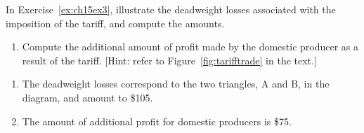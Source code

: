 \begin{enumialphparenastyle}
\begin{ex}\label{ex:ch15ex4}
In Exercise~\ref{ex:ch15ex3}, illustrate the deadweight losses associated with the imposition of the tariff, and compute the amounts.
\begin{enumerate}
\item  Compute the additional amount of profit made by the domestic producer as a result of the tariff. [Hint: refer to Figure~\ref{fig:tarifftrade} in the text.]
\end{enumerate}
\begin{sol}
\begin{enumerate}
	\item	The deadweight losses correspond to the two triangles, A and B, in the diagram, and amount to \$105.
	\item	The amount of additional profit for domestic producers is \$75.
\end{enumerate}
\end{sol}
\end{ex}


\end{enumialphparenastyle}
